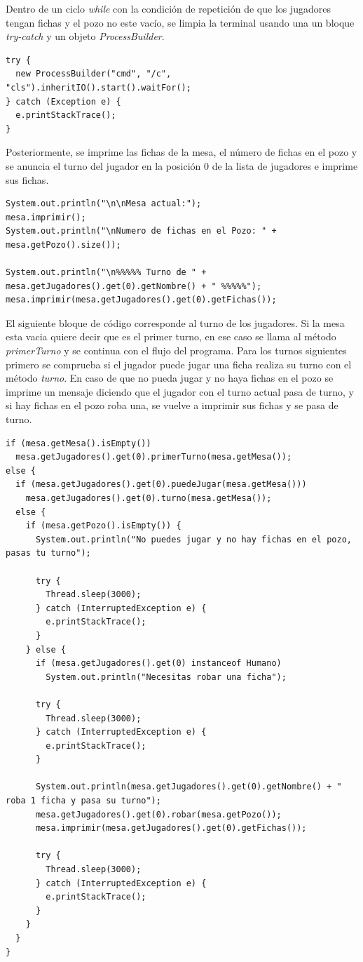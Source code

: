 \documentclass[12pt]{article}
\begin{document}
  Dentro de un ciclo \textit{while} con la condición de repetición de que los jugadores tengan fichas y el pozo no este vacío, se limpia la terminal usando una un bloque \textit{try-catch} y un objeto \textit{ProcessBuilder}.

  \begin{lstlisting}
try {
  new ProcessBuilder("cmd", "/c", "cls").inheritIO().start().waitFor();
} catch (Exception e) {
  e.printStackTrace();
}
  \end{lstlisting}

  Posteriormente, se imprime las fichas de la mesa, el número de fichas en el pozo y se anuncia el turno del jugador en la posición 0 de la lista de jugadores e imprime sus fichas. 

  \begin{lstlisting}
System.out.println("\n\nMesa actual:");
mesa.imprimir();
System.out.println("\nNumero de fichas en el Pozo: " + mesa.getPozo().size());

System.out.println("\n%%%%% Turno de " + mesa.getJugadores().get(0).getNombre() + " %%%%%");
mesa.imprimir(mesa.getJugadores().get(0).getFichas());
  \end{lstlisting}
 
  El siguiente bloque de código corresponde al turno de los jugadores. Si la mesa esta vacia quiere decir que es el primer turno, en ese caso se llama al método \textit{primerTurno} y se continua con el flujo del programa. Para los turnos siguientes primero se comprueba si el jugador puede jugar una ficha realiza su turno con el método \textit{turno}. En caso de que no pueda jugar y no haya fichas en el pozo se imprime un mensaje diciendo que el jugador con el turno actual pasa de turno, y si hay fichas en el pozo roba una, se vuelve a imprimir sus fichas y se pasa de turno. 

  \begin{lstlisting}
if (mesa.getMesa().isEmpty())
  mesa.getJugadores().get(0).primerTurno(mesa.getMesa());
else {
  if (mesa.getJugadores().get(0).puedeJugar(mesa.getMesa())) 
    mesa.getJugadores().get(0).turno(mesa.getMesa());
  else { 
    if (mesa.getPozo().isEmpty()) { 
      System.out.println("No puedes jugar y no hay fichas en el pozo, pasas tu turno");

      try {
        Thread.sleep(3000);
      } catch (InterruptedException e) {
        e.printStackTrace();
      }
    } else {
      if (mesa.getJugadores().get(0) instanceof Humano)
        System.out.println("Necesitas robar una ficha");

      try {
        Thread.sleep(3000);
      } catch (InterruptedException e) {
        e.printStackTrace();
      }

      System.out.println(mesa.getJugadores().get(0).getNombre() + " roba 1 ficha y pasa su turno");
      mesa.getJugadores().get(0).robar(mesa.getPozo());
      mesa.imprimir(mesa.getJugadores().get(0).getFichas());

      try {
        Thread.sleep(3000);
      } catch (InterruptedException e) {
        e.printStackTrace();
      }
    }
  }
}
  \end{lstlisting}
\end{document}
